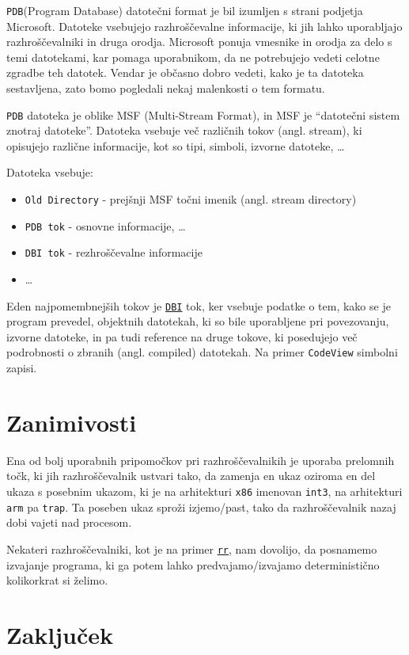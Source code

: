 \documentclass[a4paper,notitlepage]{article}
\newcommand{\code}[1]{\texttt{#1}}
\begin{document}
\code{PDB}\cite{llvm-pdb}(Program Database) datotečni format je bil izumljen s strani podjetja Microsoft. Datoteke vsebujejo razhroščevalne informacije, ki jih lahko uporabljajo razhroščevalniki in druga orodja.
Microsoft ponuja vmesnike in orodja za delo s temi datotekami, kar pomaga uporabnikom, da ne potrebujejo vedeti celotne zgradbe teh datotek.
Vendar je občasno dobro vedeti, kako je ta datoteka sestavljena, zato bomo pogledali nekaj malenkosti o tem formatu.

\code{PDB} datoteka je oblike MSF (Multi-Stream Format), in MSF je ``datotečni sistem znotraj datoteke''. Datoteka vsebuje več različnih tokov (angl. stream), ki opisujejo različne informacije, kot so tipi, simboli, izvorne datoteke, \ldots

Datoteka vsebuje:
\begin{itemize}
    \item \code{Old Directory} -  prejšnji MSF točni imenik (angl. stream directory)
    \item \code{PDB tok} - osnovne informacije, \ldots
    \item \code{DBI tok} - rezhroščevalne informacije
    \item \ldots
\end{itemize}

Eden najpomembnejših tokov je \href{https://llvm.org/docs/PDB/DbiStream.html}{\code{DBI}} tok, ker vsebuje podatke o tem, kako se je program prevedel, objektnih datotekah, ki so bile uporabljene pri povezovanju, izvorne datoteke, in pa tudi reference na druge tokove, ki posedujejo več podrobnosti o zbranih (angl. compiled) datotekah. Na primer \code{CodeView} simbolni zapisi.

\section{Zanimivosti}

Ena od bolj uporabnih pripomočkov pri razhroščevalnikih je uporaba prelomnih točk, ki jih razhroščevalnik ustvari tako, da zamenja en ukaz oziroma en del ukaza s posebnim ukazom, ki je na arhitekturi \code{x86} imenovan \code{int3}, na arhitekturi \code{arm} pa 
\code{trap}. Ta poseben ukaz sproži izjemo/past, tako da razhroščevalnik nazaj dobi vajeti nad procesom.

Nekateri razhroščevalniki, kot je na primer \href{https://rr-project.org/}{\code{rr}}, nam dovolijo, da posnamemo izvajanje programa, ki ga potem lahko predvajamo/izvajamo deterministično kolikorkrat si želimo.

\section{Zaključek}



\nocite{*} %


\end{document}
